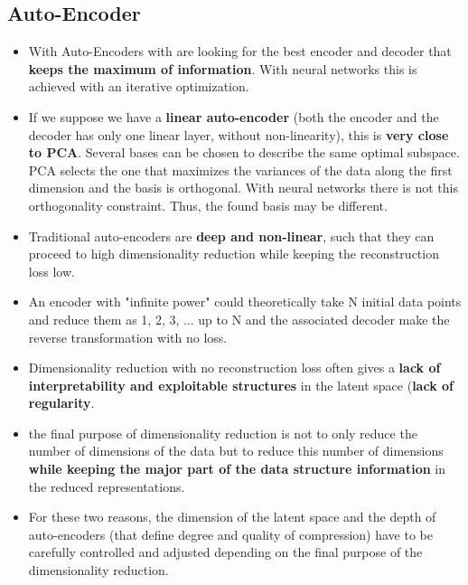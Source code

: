 \subsection{Auto-Encoder}
\begin{itemize}
    \item With Auto-Encoders with are looking for the best encoder and decoder that \textbf{keeps the maximum of information}. With neural networks this is achieved with an iterative optimization.
    \item If we suppose we have a \textbf{linear auto-encoder} (both the encoder and the decoder has only one linear layer, without non-linearity), this is \textbf{very close to PCA}. Several bases can be chosen to describe the same optimal subspace. PCA selects the one that maximizes the variances of the data along the first dimension and the basis is orthogonal. With neural networks there is not this orthogonality constraint. Thus, the found basis may be different.
    \item Traditional auto-encoders are \textbf{deep and non-linear}, such that they can proceed to high dimensionality reduction while keeping the reconstruction loss low.
    \item An encoder with "infinite power" could theoretically take N initial data points and reduce them as 1, 2, 3, ... up to N  and the associated decoder make the reverse transformation with no loss.
    \item Dimensionality reduction with no reconstruction loss often gives a \textbf{lack of interpretability and exploitable structures} in the latent space (\textbf{lack of regularity}.
    \item the final purpose of dimensionality reduction is not to only reduce the number of dimensions of the data but to reduce this number of dimensions \textbf{while keeping the major part of the data structure information} in the reduced representations.
    \item For these two reasons, the dimension of the latent space and the depth of auto-encoders (that define degree and quality of compression) have to be carefully controlled and adjusted depending on the final purpose of the dimensionality reduction.
\end{itemize}


